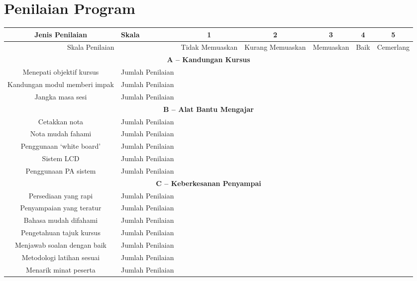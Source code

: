 \documentclass[a4paper,12pt]{article}
\begin{document}
\section{Penilaian Program}
\begin{tabular}{|c|p{6cm}|c|c|c|c|c|}
    \hline
    \rowcolor{lightgray}
    \textbf{Jenis Penilaian} & \textbf{Skala} & \textbf{1} & \textbf{2} & \textbf{3} & \textbf{4} & \textbf{5} \\
    \hline
    \multicolumn{2}{|c|}{Skala Penilaian} & Tidak Memuaskan & Kurang Memuaskan & Memuaskan & Baik & Cemerlang \\
    \hline
    \multicolumn{7}{|c|}{\textbf{A – Kandungan Kursus}} \\
    \hline
    Menepati objektif kursus & Jumlah Penilaian &  &  &  &  &  \\
    \hline
    Kandungan modul memberi impak & Jumlah Penilaian &  &  &  &  &  \\
    \hline
    Jangka masa sesi & Jumlah Penilaian &  &  &  &  &  \\
    \hline
    \multicolumn{7}{|c|}{\textbf{B – Alat Bantu Mengajar}} \\
    \hline
    Cetakkan nota & Jumlah Penilaian &  &  &  &  &  \\
    \hline
    Nota mudah fahami & Jumlah Penilaian &  &  &  &  &  \\
    \hline
    Penggunaan ‘white board’ & Jumlah Penilaian &  &  &  &  &  \\
    \hline
    Sistem LCD & Jumlah Penilaian &  &  &  &  &  \\
    \hline
    Penggunaan PA sistem & Jumlah Penilaian &  &  &  &  &  \\
    \hline
    \multicolumn{7}{|c|}{\textbf{C – Keberkesanan Penyampai}} \\
    \hline
    Persediaan yang rapi & Jumlah Penilaian &  &  &  &  &  \\
    \hline
    Penyampaian yang teratur & Jumlah Penilaian &  &  &  &  &  \\
    \hline
    Bahasa mudah difahami & Jumlah Penilaian &  &  &  &  &  \\
    \hline
    Pengetahuan tajuk kursus & Jumlah Penilaian &  &  &  &  &  \\
    \hline
    Menjawab soalan dengan baik & Jumlah Penilaian &  &  &  &  &  \\
    \hline
    Metodologi latihan sesuai & Jumlah Penilaian &  &  &  &  &  \\
    \hline
    Menarik minat peserta & Jumlah Penilaian &  &  &  &  &  \\

\end{tabular}
\end{document}
